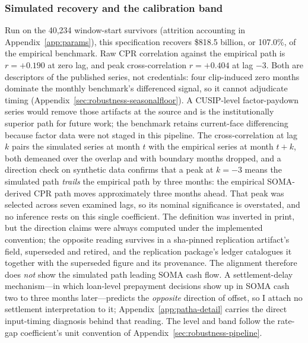 \subsubsection{Simulated recovery and the calibration band}

Run on the 40,234 window-start survivors (attrition accounting in Appendix~\ref{app:params}), this specification recovers \$818.5 billion, or 107.0\%, of the empirical benchmark. Raw CPR correlation against the empirical path is $r = +0.190$ at zero lag, and peak cross-correlation $r = +0.404$ at lag $-3$. Both are descriptors of the published series, not credentials: four clip-induced zero months dominate the monthly benchmark's differenced signal, so it cannot adjudicate timing (Appendix~\ref{sec:robustness-seasonalfloor}). A CUSIP-level factor-paydown series would remove those artifacts at the source and is the institutionally superior path for future work; the benchmark retains current-face differencing because factor data were not staged in this pipeline. The cross-correlation at lag $k$ pairs the simulated series at month $t$ with the empirical series at month $t+k$, both demeaned over the overlap and with boundary months dropped, and a direction check on synthetic data confirms that a peak at $k=-3$ means the simulated path \emph{trails} the empirical path by three months: the empirical SOMA-derived CPR path moves approximately three months ahead. That peak was selected across seven examined lags, so its nominal significance is overstated, and no inference rests on this single coefficient. The definition was inverted in print, but the direction claims were always computed under the implemented convention; the opposite reading survives in a sha-pinned replication artifact's field, superseded and retired, and the replication package's ledger catalogues it together with the superseded figure and its provenance. The alignment therefore does \emph{not} show the simulated path leading SOMA cash flow. A settlement-delay mechanism---in which loan-level prepayment decisions show up in SOMA cash two to three months later---predicts the \emph{opposite} direction of offset, so I attach no settlement interpretation to it; Appendix~\ref{app:patha-detail} carries the direct input-timing diagnosis behind that reading. The level and band follow the rate-gap coefficient's unit convention of Appendix~\ref{sec:robustness-pipeline}.

